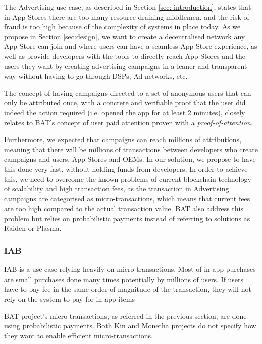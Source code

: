 The Advertising use case, as described in Section \ref{sec: introduction}, states that in App Stores there are too many resource-draining middlemen, and the risk of fraud is too high because of the complexity of systems in place today. As we propose in Section \ref{sec:design}, we want to create a decentralised network any App Store can join and where users can have a seamless App Store experience, as well as provide developers with the tools to directly reach App Stores and the users they want by creating advertising campaigns in a leaner and transparent way without having to go through DSPs, Ad networks, etc.

The concept of having campaigns directed to a set of anonymous users that can only be attributed once, with a concrete and verifiable proof that the user did indeed the action required (i.e. opened the app for at least 2 minutes), closely relates to BAT's concept of user paid attention proven with a \textit{proof-of-attention}.

Furthermore, we expected that campaigns can reach millions of attributions, meaning that there will be millions of transactions between developers who create campaigns and users, App Stores and OEMs. In our solution, we propose to have this done very fast, without holding funds from developers. In order to achieve this, we need to overcome the known problems of current blockchain technology of scalability and high transaction fees, as the transaction in Advertising campaigns are categorised as micro-transactions, which means that current fees are too high compared to the actual transaction value. BAT also address this problem but relies on probabilistic payments \cite{MICROPAY1, MICROPAY2} instead of referring to solutions as Raiden or Plasma.

\subsubsection{IAB}

IAB is a use case relying heavily on micro-transactions. Most of in-app purchases are small purchases done many times potentially by millions of users. If users have to pay fee in the same order of magnitude of the transaction, they will not rely on the system to pay for in-app items

BAT project's micro-transactions, as referred in the previous section, are done using probabilistic payments. Both Kin and Monetha projects do not specify how they want to enable efficient micro-transactions.

